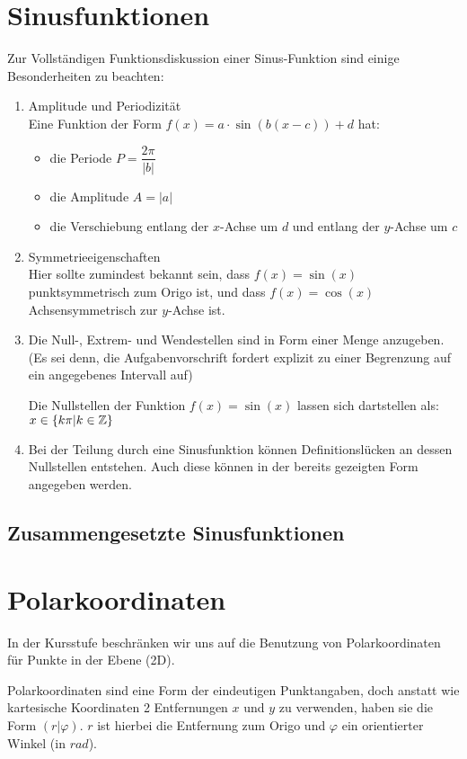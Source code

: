 \section{Sinusfunktionen}
Zur Vollständigen Funktionsdiskussion einer Sinus-Funktion sind einige Besonderheiten zu beachten:
\begin{enumerate}
  \item Amplitude und Periodizität\\
  Eine Funktion der Form $f(x)=a\cdot\sin(b(x-c))+d$ hat:
  \begin{itemize}
    \item die Periode $P = \dfrac{2\pi}{|b|}$
    \item die Amplitude $A = |a|$
    \item die Verschiebung entlang der $x$-Achse um $d$ und entlang der $y$-Achse um $c$
    \end{itemize}
  \item Symmetrieeigenschaften\\
  Hier sollte zumindest bekannt sein, dass $f(x)=\sin(x)$ punktsymmetrisch zum Origo ist, und dass $f(x)=\cos(x)$ Achsensymmetrisch zur $y$-Achse ist.
  \item Die Null-, Extrem- und Wendestellen sind in Form einer Menge anzugeben. (Es sei denn, die Aufgabenvorschrift fordert explizit zu einer Begrenzung auf ein angegebenes Intervall auf)\\
  \begin{Beispiel}
    Die Nullstellen der Funktion $f(x)=\sin(x)$ lassen sich dartstellen als: $x \in \{k\pi|k \in \mathbb{Z}\}$
  \end{Beispiel}
  \item Bei der Teilung durch eine Sinusfunktion können Definitionslücken an dessen Nullstellen entstehen. Auch diese können in der bereits gezeigten Form angegeben werden.
  \end{enumerate}
\subsection{Zusammengesetzte Sinusfunktionen}
\section{Polarkoordinaten}
In der Kursstufe beschränken wir uns auf die Benutzung von Polarkoordinaten für Punkte in der Ebene (2D).
\begin{Definition}
  Polarkoordinaten sind eine Form der eindeutigen Punktangaben, doch anstatt wie kartesische Koordinaten 2 Entfernungen $x$ und $y$ zu verwenden, haben sie die Form $(r|\varphi)$. $r$ ist hierbei die Entfernung zum Origo und $\varphi$ ein orientierter Winkel (in $rad$).
\end{Definition}


